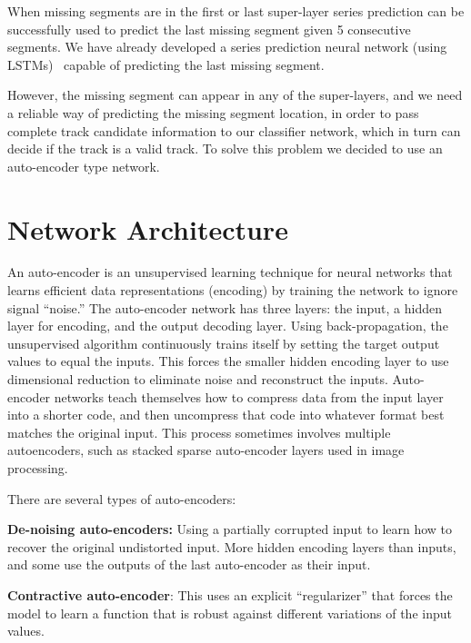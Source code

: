 \documentclass[12pt]{article}
\begin{document}
When missing segments are in the first or last super-layer series prediction can be successfully used to predict the last missing segment given 5 consecutive segments. We have already developed a series prediction neural network (using LSTMs)~\cite{Angelopoulos20P} capable of predicting the last missing segment. 

However, the missing segment can appear in any of the super-layers, and we need a reliable way of predicting the missing segment location, in order to pass complete track candidate information to our classifier network, which in turn can decide if the track is a valid track. To solve this problem we decided to use an auto-encoder type network.

\section{Network Architecture}

\indent

An auto-encoder is an unsupervised learning technique for neural networks that learns efficient data representations (encoding) by training the network to ignore signal “noise.” 
The auto-encoder network has three layers: the input, a hidden layer for encoding, and the output decoding layer. Using back-propagation, the unsupervised algorithm continuously trains itself by setting the target output values to equal the inputs. This forces the smaller hidden encoding layer to use dimensional reduction to eliminate noise and reconstruct the inputs.
Auto-encoder networks teach themselves how to compress data from the input layer into a shorter code, and then uncompress that code into whatever format best matches the original input. This process sometimes involves multiple autoencoders, such as stacked sparse auto-encoder layers used in image processing.

There are several types of auto-encoders:

{\bf De-noising auto-encoders:}  Using a partially corrupted input to learn how to recover the original undistorted input.
 More hidden encoding layers than inputs, and some use the outputs of the last auto-encoder as their input.

{\bf Contractive auto-encoder}: This uses an explicit “regularizer” that forces the model to learn a function that is robust against different variations of the input values.
\end{document}
